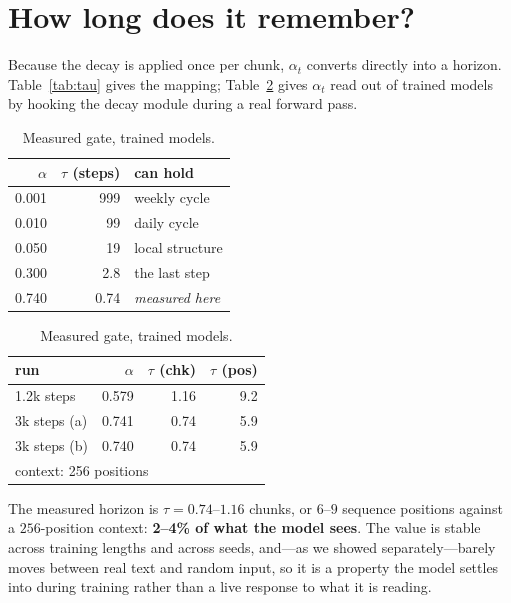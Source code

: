 \documentclass{article}
\begin{document}
\section{How long does it remember?}

Because the decay is applied once per chunk, $\alpha_t$ converts directly into a
horizon. Table~\ref{tab:tau} gives the mapping; Table~\ref{tab:measured} gives
$\alpha_t$ read out of trained models by hooking the decay module during a real
forward pass.

\begin{table}[h]
\centering
\begin{minipage}{0.46\textwidth}
\centering
\caption{A decay rate is a horizon.}
\label{tab:tau}
\small
\begin{tabular}{rrl}
\toprule
$\alpha$ & $\tau$ (steps) & can hold \\
\midrule
0.001 & 999 & weekly cycle \\
0.010 & 99 & daily cycle \\
0.050 & 19 & local structure \\
0.300 & 2.8 & the last step \\
0.740 & 0.74 & \emph{measured here} \\
\bottomrule
\end{tabular}
\end{minipage}\hfill
\begin{minipage}{0.50\textwidth}
\centering
\caption{Measured gate, trained models.}
\label{tab:measured}
\small
\begin{tabular}{lrrr}
\toprule
run & $\alpha$ & $\tau$ (chk) & $\tau$ (pos) \\
\midrule
1.2k steps & 0.579 & 1.16 & 9.2 \\
3k steps (a) & 0.741 & 0.74 & 5.9 \\
3k steps (b) & 0.740 & 0.74 & 5.9 \\
\midrule
\multicolumn{4}{l}{\footnotesize context: 256 positions} \\
\bottomrule
\end{tabular}
\end{minipage}
\end{table}

The measured horizon is $\tau=0.74$--$1.16$ chunks, or $6$--$9$ sequence
positions against a $256$-position context: \textbf{2--4\% of what the model
sees}. The value is stable across training lengths and across seeds, and---as we
showed separately---barely moves between real text and random input, so it is a
property the model settles into during training rather than a live response to
what it is reading.
\end{document}

